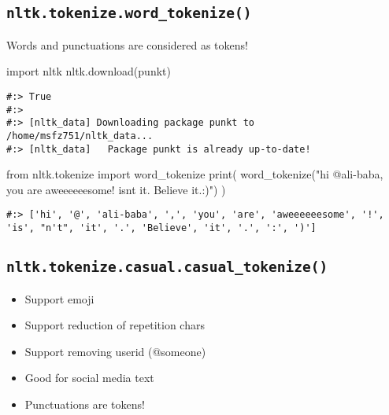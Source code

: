 \documentclass[
]{book}
\newenvironment{Shaded}{\begin{snugshade}}{\end{snugshade}}
\newcommand{\BuiltInTok}[1]{#1}
\newcommand{\ImportTok}[1]{#1}
\newcommand{\NormalTok}[1]{#1}
\newcommand{\StringTok}[1]{\textcolor[rgb]{0.5,0.5,0.5}{#1}}
\providecommand{\tightlist}{%
  \setlength{\itemsep}{0pt}\setlength{\parskip}{0pt}}
\begin{document}
\hypertarget{nltk.tokenize.word_tokenize}{%
\subsection{\texorpdfstring{\texttt{nltk.tokenize.word\_tokenize()}}{nltk.tokenize.word\_tokenize()}}\label{nltk.tokenize.word_tokenize}}

Words and punctuations are considered as tokens!

\begin{Shaded}
\begin{Highlighting}[]
\ImportTok{import}\NormalTok{ nltk}
\NormalTok{nltk.download(}\StringTok{\textquotesingle{}punkt\textquotesingle{}}\NormalTok{)}
\end{Highlighting}
\end{Shaded}

\begin{verbatim}
#:> True
#:> 
#:> [nltk_data] Downloading package punkt to /home/msfz751/nltk_data...
#:> [nltk_data]   Package punkt is already up-to-date!
\end{verbatim}

\begin{Shaded}
\begin{Highlighting}[]
\ImportTok{from}\NormalTok{ nltk.tokenize }\ImportTok{import}\NormalTok{ word\_tokenize}
\BuiltInTok{print}\NormalTok{( word\_tokenize(}\StringTok{"hi @ali{-}baba, you are aweeeeeesome! isn\textquotesingle{}t it. Believe it.:)"}\NormalTok{) )}
\end{Highlighting}
\end{Shaded}

\begin{verbatim}
#:> ['hi', '@', 'ali-baba', ',', 'you', 'are', 'aweeeeeesome', '!', 'is', "n't", 'it', '.', 'Believe', 'it', '.', ':', ')']
\end{verbatim}

\hypertarget{nltk.tokenize.casual.casual_tokenize}{%
\subsection{\texorpdfstring{\texttt{nltk.tokenize.casual.casual\_tokenize()}}{nltk.tokenize.casual.casual\_tokenize()}}\label{nltk.tokenize.casual.casual_tokenize}}

\begin{itemize}
\tightlist
\item
  Support emoji
\item
  Support reduction of repetition chars
\item
  Support removing userid (@someone)
\item
  Good for social media text
\item
  Punctuations are tokens!
\end{itemize}
\end{document}
